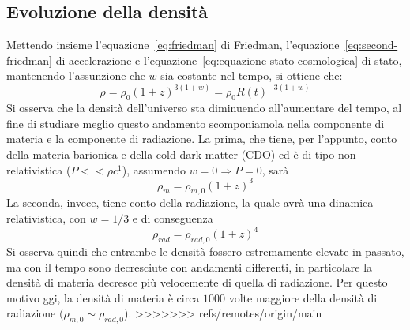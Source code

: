\subsection{Evoluzione della densità}\label{sec:evoluazione-densita}
Mettendo insieme l'equazione~\ref{eq:friedman} di Friedman, l'equazione~\ref{eq:second-friedman} di accelerazione e l'equazione~\ref{eq:equazione-stato-cosmologica} di stato, mantenendo l'assunzione che $w$ sia costante nel tempo, si ottiene che:
\[
    \rho = \rho_0 (1+z)^{3(1+w)} = \rho_0 R(t)^{-3(1+w)}
\]
Si osserva che la densità dell'universo sta diminuendo all'aumentare del tempo, al fine di studiare meglio questo andamento scomponiamola nella componente di materia e la componente di radiazione. La prima, che tiene, per l'appunto, conto della materia barionica e della cold dark matter (CDO) ed è di tipo non relativistica ($P<<\rho c^1$), assumendo $w = 0 \Rightarrow P=0$, sarà
\[
    \rho_m = \rho_{m,0}(1+z)^3
\]
La seconda, invece, tiene conto della radiazione, la quale avrà una dinamica relativistica, con $w = 1/3$ e di conseguenza
\[
    \rho_{rad} = \rho_{rad, 0}(1+z)^4
\]
Si osserva quindi che entrambe le densità fossero estremamente elevate in passato, ma con il tempo sono decresciute con andamenti differenti, in particolare la densità di materia decresce più velocemente di quella di radiazione. Per questo motivo ggi, la densità di materia è circa $1000$ volte maggiore della densità di radiazione $(\rho_{m,0} \sim \rho_{rad, 0}$).
>>>>>>> refs/remotes/origin/main
